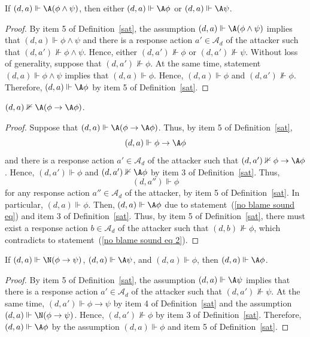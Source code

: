\documentclass[letterpaper]{article}
\begin{document}
\begin{lemma}\label{conjunction sound}
If $(d,a)\Vdash \A(\phi\wedge\psi)$, then either $(d,a)\Vdash \A\phi$ or $(d,a)\Vdash \A\psi$.
\end{lemma}
\begin{proof}
By item 5 of Definition~\ref{sat}, the assumption $(d,a)\Vdash \A(\phi\wedge\psi)$ implies that $(d,a)\Vdash \phi\wedge\psi$ and there is a response action $a'\in\mathcal{A}_d$ of the attacker such that $(d,a')\nVdash \phi\wedge\psi$. Hence, either $(d,a')\nVdash \phi$ or $(d,a')\nVdash \psi$. Without loss of generality, suppose that $(d,a')\nVdash \phi$. At the same time, statement $(d,a)\Vdash \phi\wedge\psi$ implies that $(d,a)\Vdash \phi$. Hence, $(d,a)\Vdash \phi$ and $(d,a')\nVdash \phi$. Therefore, $(d,a)\Vdash \A\phi$ by item 5 of Definition~\ref{sat}.
\end{proof}

\begin{lemma}
$(d,a)\nVdash\A(\phi\to\A\phi)$.
\end{lemma}
\begin{proof}
Suppose that $(d,a)\Vdash\A(\phi\to\A\phi)$. Thus, by item 5 of Definition~\ref{sat}, 
\begin{equation}\label{no blame sound eq}
    (d,a)\Vdash\phi\to\A\phi
\end{equation}
and there is a response action $a'\in\mathcal{A}_d$ of the attacker such that $(d,a')\nVdash\phi\to\A\phi$. Hence, $(d,a')\Vdash\phi$ and $(d,a')\nVdash\A\phi$ by item 3 of Definition~\ref{sat}. Thus, 
\begin{equation}\label{no blame sound eq 2}
    (d,a'')\Vdash\phi
\end{equation}
for any response action $a''\in\mathcal{A}_d$ of the attacker, by item 5 of Definition~\ref{sat}. In particular, $(d,a)\Vdash\phi$. Then, $(d,a)\Vdash\A\phi$ due to statement~(\ref{no blame sound eq}) and item 3 of Definition~\ref{sat}. Thus, by item 5 of Definition~\ref{sat}, there must exist a response action $b\in\mathcal{A}_d$ of the attacker such that $(d,b)\nVdash\phi$, which contradicts to statement~(\ref{no blame sound eq 2}).
\end{proof}

\begin{lemma}\label{strict conditional soundness}
If $(d,a)\Vdash \N(\phi\to\psi)$, $(d,a)\Vdash \A\psi$, and $(d,a)\Vdash \phi$, then $(d,a)\Vdash \A\phi$.
\end{lemma}
\begin{proof}
By item 5 of Definition~\ref{sat}, the assumption $(d,a)\Vdash \A\psi$ implies that there is a response action $a'\in\mathcal{A}_d$ of the attacker such that $(d,a')\nVdash \psi$. At the same time, $(d,a')\Vdash \phi\to\psi$ by item 4 of Definition~\ref{sat} and the assumption $(d,a)\Vdash \N(\phi\to\psi)$. Hence, $(d,a')\nVdash \phi$ by item 3 of Definition~\ref{sat}. Therefore, $(d,a)\Vdash \A\phi$ by the assumption $(d,a)\Vdash \phi$ and item 5 of Definition~\ref{sat}.
\end{proof}
\end{document}

